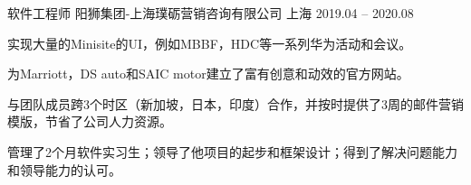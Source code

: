\begin{cventries}
  \cventry
    {软件工程师} %
    {阳狮集团-上海璞砺营销咨询有限公司} %
    {上海} %
    {2019.04 -- 2020.08} %
    {
      \begin{cvitems} %
        \item{实现大量的Minisite的UI，例如MBBF，HDC等一系列华为活动和会议。}
        \item{为Marriott，DS auto和SAIC motor建立了富有创意和动效的官方网站。}
        \item{与团队成员跨3个时区（新加坡，日本，印度）合作，并按时提供了3周的邮件营销模版，节省了公司人力资源。}
        \item{管理了2个月软件实习生；领导了他项目的起步和框架设计；得到了解决问题能力和领导能力的认可。}
      \end{cvitems}
    }

\end{cventries}

